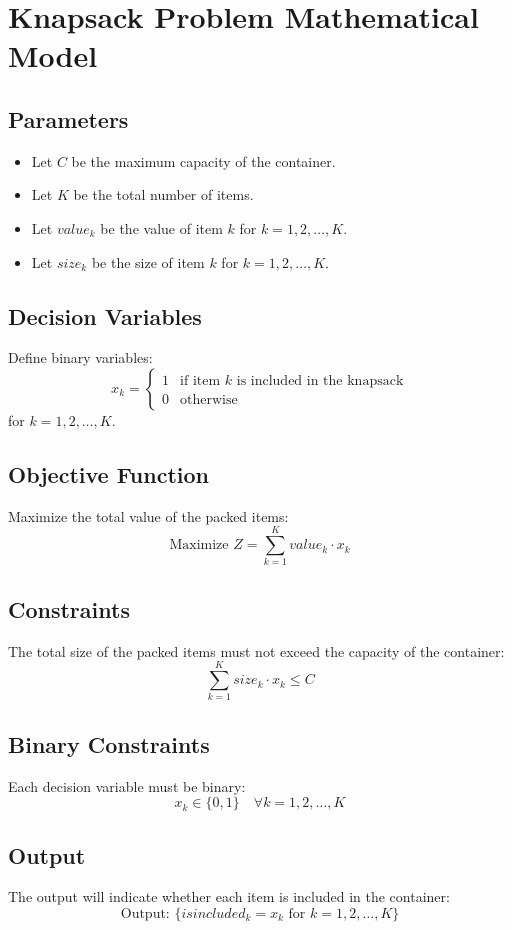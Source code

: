 \documentclass{article}
\begin{document}
\section*{Knapsack Problem Mathematical Model}

\subsection*{Parameters}
\begin{itemize}
    \item Let \( C \) be the maximum capacity of the container.
    \item Let \( K \) be the total number of items.
    \item Let \( value_k \) be the value of item \( k \) for \( k = 1, 2, \ldots, K \).
    \item Let \( size_k \) be the size of item \( k \) for \( k = 1, 2, \ldots, K \).
\end{itemize}

\subsection*{Decision Variables}
Define binary variables:
\[
x_k = 
\begin{cases} 
1 & \text{if item } k \text{ is included in the knapsack} \\
0 & \text{otherwise}
\end{cases}
\]
for \( k = 1, 2, \ldots, K \).

\subsection*{Objective Function}
Maximize the total value of the packed items:
\[
\text{Maximize } Z = \sum_{k=1}^{K} value_k \cdot x_k
\]

\subsection*{Constraints}
The total size of the packed items must not exceed the capacity of the container:
\[
\sum_{k=1}^{K} size_k \cdot x_k \leq C
\]

\subsection*{Binary Constraints}
Each decision variable must be binary:
\[
x_k \in \{0, 1\} \quad \forall k = 1, 2, \ldots, K
\]

\subsection*{Output}
The output will indicate whether each item is included in the container:
\[
\text{Output: } \{ isincluded_k = x_k \text{ for } k = 1, 2, \ldots, K \}
\]
\end{document}

